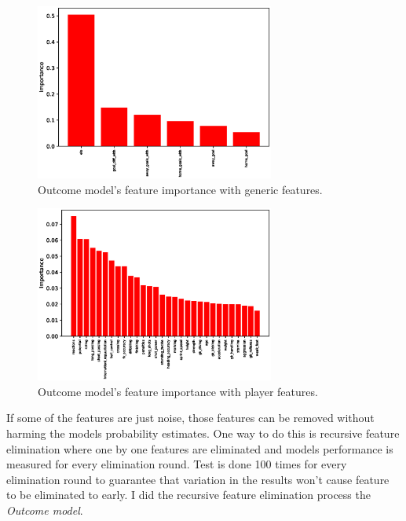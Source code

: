\begin{figure}[H]
    \centering
    \includegraphics[width=0.7\textwidth]{img/match_level_2018_outcome_feature_importance_gf_feature_importance.eps}
    \caption{Outcome model's feature importance with generic features.}
    \label{fig:outcome_feature_importance_gf}
\end{figure}

\begin{figure}[H]
    \centering
    \includegraphics[width=0.7\textwidth]{img/match_level_2018_outcome_feature_importance_pf_feature_importance.eps}
    \caption{Outcome model's feature importance with player features.}
    \label{fig:outcome_feature_importance_pf}
\end{figure}

If some of the features are just noise, those features can be removed without harming the models probability estimates. One way to do this is recursive feature elimination where one by one features are eliminated and models performance is measured for every  elimination round. Test is done 100 times for every elimination round to guarantee that variation in the results won't cause feature to be eliminated to early. I did the recursive feature elimination process the \textit{Outcome model}.

